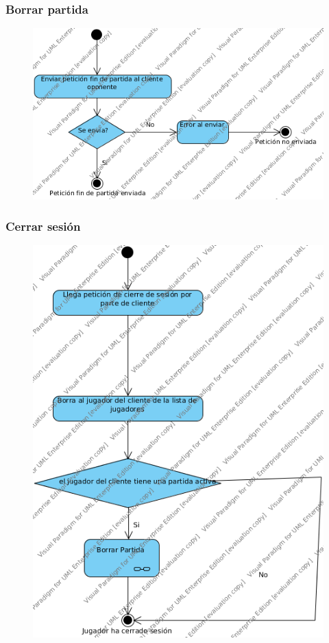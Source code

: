 \subsubsection{Borrar partida}
 \begin{figure}[h]
 \centering
 \includegraphics[scale=0.5]{img/ms_BorrarPartidaServidor.png}
 \end{figure}
 \clearpage
\subsubsection{Cerrar sesión}
 \begin{figure}[h]
 \centering
 \includegraphics[scale=0.5]{img/ms_CerrarSesionServidor.png}
 \end{figure}
